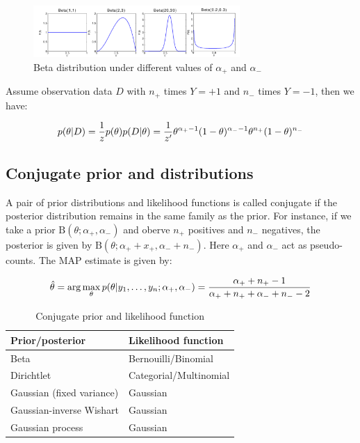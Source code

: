 \documentclass[a4paper,10pt,twoside]{article}
\begin{document}
\begin{figure}
  \centering
  \includegraphics[width=0.7\textwidth]{figures/beta_distribution.png}
  \caption{Beta distribution under different values of $\alpha_+$ and $\alpha_-$}
  \label{fig:beta_dist}
\end{figure}

Assume observation data $D$ with $n_+$ times $Y=+1$ and $n_-$ times $Y=-1$, then we have:

\begin{equation*}
  p(\theta|D)={1\over z}p(\theta)p(D|\theta)={1\over z'}\theta^{\alpha_+-1}(1-\theta)^{\alpha_--1}\theta^{n_+}(1-\theta)^{n_-}
\end{equation*}

\subsection{Conjugate prior and distributions}

A pair of prior distributions and likelihood functions is called conjugate if the posterior distribution remains in the same family as the prior. For instance, if we take a prior $\mathrm {B} (\theta;\alpha_+,\alpha_-)$ and oberve $n_+$ positives and $n_-$ negatives, the posterior is given by $\mathrm {B} (\theta;\alpha_++x_+,\alpha_-+n_-)$. Here $\alpha_+$ and $\alpha_-$ act as pseudo-counts. The MAP estimate is given by:

\begin{equation*}
  \hat{\theta} = \arg\max_{\theta}p(\theta|y_1,\ldots,y_n;\alpha_+,\alpha_-)={\alpha_++n_+-1\over \alpha_++n_++\alpha_-+n_--2}
\end{equation*}

\begin{table}
  \centering
  \begin{tabular}{ll}
    \toprule
    \textbf{Prior/posterior} & \textbf{Likelihood function}\\
    \midrule
    Beta & Bernouilli/Binomial\\
    Dirichtlet & Categorial/Multinomial\\
    Gaussian (fixed variance) & Gaussian\\
    Gaussian-inverse Wishart & Gaussian\\
    Gaussian process & Gaussian\\
    \bottomrule
  \end{tabular}
  \caption{Conjugate prior and likelihood function}
  \label{tab:likelihood_function}
\end{table}
\end{document}
